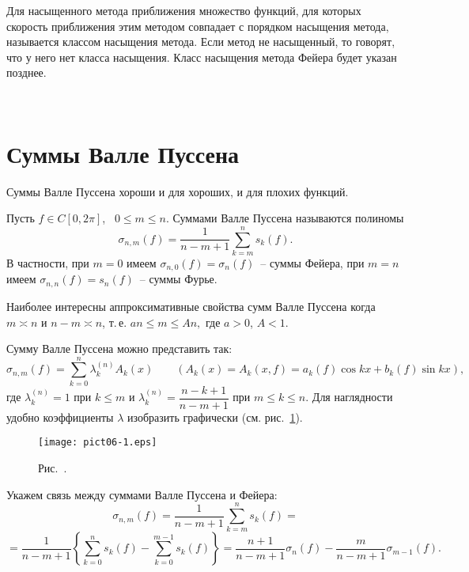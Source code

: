 {Для насыщенного метода приближения множество функций, для
которых скорость приближения этим методом совпадает с
порядком насыщения метода, называется классом насыщения
метода. Если метод не насыщенный, то говорят, что у него
нет класса насыщения. Класс насыщения метода Фейера будет
указан позднее.

\ \

\section{Суммы Валле Пуссена}

Суммы Валле Пуссена хороши и для хороших, и для плохих функций.

Пусть {$f\in C[0,2\pi]$},~ $0\le m\le n$. Суммами Валле Пуссена называются
полиномы
$$
\sigma_{n,m}(f)=\frac{1}{n-m+1} \sum\limits_{k=m}^{n}s_k(f).
$$
В частности, при $m=0$ имеем $\sigma_{n,0}(f)=\sigma_n(f)$~-- суммы Фейера, при $m=n$
имеем $\sigma_{n,n}(f)=s_n(f)$~-- суммы Фурье.

Наиболее интересны аппроксимативные свойства сумм Валле Пуссена когда $m\asymp n$ и $n-m
\asymp n$, т.\,е. $an\le m\le An,$ где $a>0$, $A<1$.

Сумму Валле Пуссена можно представить так:
$$
\sigma_{n,m}(f)=\sum\limits_{k=0}^n \lambda_k^{(n)} A_k(x) \qquad
{(A_k(x)=A_k(x,f)=a_k(f)\cos kx+b_k(f)\sin kx),}
$$
где $\lambda_k^{(n)}=1$ при $k\le m$ и $\lambda_k^{(n)}=\dfrac{n-k+1}{n-m+1}$
при $m\le k\le n.$ Для наглядности удобно коэффициенты $\lambda$
изобразить графически {(см. рис.~\ref{r6-1})}.
\vspace{7mm}

\begin{figure}[ht]
\begin{center}
\texttt{[image: pict06-1.eps]}
\end{center}
 \bigskip
 \label{r6-1}

 \centerline{Рис.~\theris. }
 \bigskip
\end{figure}
\vspace{3mm}   



Укажем связь между суммами Валле Пуссена и Фейера:
$$
\sigma_{n,m}(f)=\frac{1}{n-m+1}\sum\limits_{k=m}^n s_k(f)=
$$
$$
=\frac{1}{n-m+1} \left\{ \sum\limits_{k=0}^n s_k(f)-
\sum\limits_{k=0}^{m-1} s_k(f) \right\}
=\frac{n+1}{n-m+1}\sigma_n(f)- \frac{m}{n-m+1}\sigma_{m-1}(f).
$$

}
